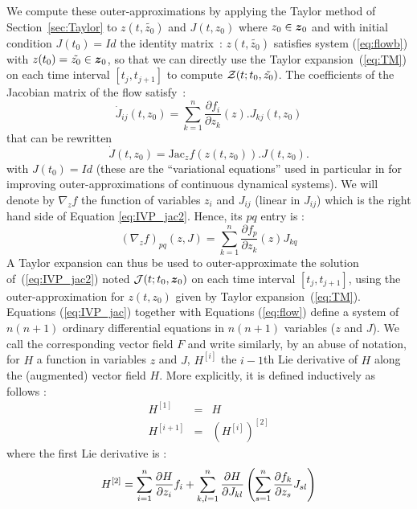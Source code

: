 \documentclass{sig-alternate-05-2015} %
\begin{document}
We compute these outer-approximations by applying the Taylor method of Section~\ref{sec:Taylor} to  $z(t,\tilde{z_0})$ 
and $J(t,z_0)$ where $z_0 \in \z_0$ and with initial condition $J(t_0)=Id$ the identity matrix~: $z(t,\tilde{z_0})$ satisfies system  (\ref{eq:flowb}) with $z(t_0)=\tilde{z_0}\in \z_0$, so that we can directly 
use the Taylor expansion~(\ref{eq:TM}) on each time interval $[t_j,t_{j+1}]$ to compute ${\cal Z}(t;t_0,\tilde{z_0})$. 
The coefficients of the Jacobian matrix of the flow satisfy~:
\begin{equation}
\dot{J}_{ij}(t,z_0) %
= \sum\limits_{k=1}^n \frac{\partial f_i}{\partial z_k}(z) . J_{kj}(t,z_0)
\label{eq:IVP_jac}
\end{equation} 
 that can be rewritten
\begin{equation}
\dot{J}(t,z_0) =  \mbox{Jac}_z f(z(t,z_0)) . J(t,z_0).
\label{eq:IVP_jac2}
\end{equation} 
with $J(t_0)=Id$ (these are the ``variational equations'' used in particular in \cite{Zgliczynski2002}
for improving outer-approximations of continuous dynamical systems).
We will %
denote by $\nabla_z f$ the function of variables $z_i$ and $J_{ij}$ (linear in $J_{ij}$) which is
the right hand side of Equation \ref{eq:IVP_jac2}. Hence, its $pq$ entry is : 
\begin{equation}
(\nabla_z f)_{pq}(z,J) = \sum\limits_{k=1}^n \frac{\partial f_p}{\partial z_k}(z) J_{kq}
\label{pqentry}
\end{equation}
A Taylor expansion can thus be used to outer-approximate the solution of~(\ref{eq:IVP_jac2}) noted ${\cal J}(t;t_0,\z_0)$ on each time interval  $[t_j,t_{j+1}]$, 
using the outer-approximation for $z(t,z_0)$ given by Taylor expansion~(\ref{eq:TM}).
Equations (\ref{eq:IVP_jac}) together with Equations
(\ref{eq:flow}) define a system of $n(n+1)$ ordinary differential equations in $n(n+1)$
variables ($z$ and $J$). We call the corresponding vector field $F$ and
write similarly, by an abuse of notation, for $H$ a function in variables $z$ and $J$,
$H^{[i]}$ the $i-1$th Lie derivative of $H$ along the (augmented) vector field $H$. More
explicitly, it is defined inductively as follows : 
\begin{eqnarray}
H^{[1]} & = & H \\ 
H^{[i+1]} & = & (H^{[i]})^{[2]}
\end{eqnarray}
\noindent where the first Lie derivative is :
\begin{equation}
H^{[2]} = 
\sum\limits_{i=1}^n \frac{\partial H}{\partial z_i} f_i \\
+\sum\limits_{k,l=1}^n \frac{\partial H}{\partial J_{kl}} \left(
\sum\limits_{s=1}^n \frac{\partial f_k}{\partial z_s} J_{sl}\right)
\label{eqfirstH}
\end{equation}
\end{document}
